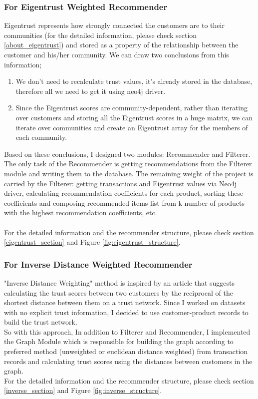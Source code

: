 \subsubsection{For Eigentrust Weighted Recommender}
Eigentrust represents how strongly connected the customers are to their communities (for the detailed information, please check section \ref{about_eigentrust}) and stored as a property of the relationship between the customer and his/her community. We can draw two conclusions from this information;
\begin{enumerate}
	\item We don't need to recalculate trust values, it's already stored in the database, therefore all we need to get it using neo4j driver.
	\item Since the Eigentrust scores are community-dependent, rather than iterating over customers and storing all the Eigentrust scores in a huge matrix, we can iterate over communities and create an Eigentrust array for the members of each community.
\end{enumerate}
Based on these conclusions, I designed two modules: Recommender and Filterer. The only task of the Recommender is getting recommendations from the Filterer module and writing them to the database.  The remaining weight of the project is carried by the Filterer: getting transactions and Eigentrust values via Neo4j driver, calculating recommendation coefficients for each product, sorting these coefficients and composing recommended items list from k number of products with the highest recommendation coefficients, etc. \\ \\
For the detailed information and the recommender structure, please check section \ref{eigentrust_section} and Figure \ref{fig:eigentrust_structure}.
\subsubsection{For Inverse Distance Weighted Recommender}
"Inverse Distance Weighting" method is inspired by an article\cite{inverse_article} that suggests calculating the trust scores between two customers by the reciprocal of the shortest distance between them on a trust network. Since I worked on datasets with no explicit trust information, I decided to use customer-product records to build the trust network. \\

So with this approach, In addition to Filterer and Recommender, I implemented the Graph Module which is responsible for building the graph according to preferred method (unweighted or euclidean distance weighted) from transaction records and calculating trust scores using the distances between customers in the graph. \\

For the detailed information and the recommender structure, please check section \ref{inverse_section} and Figure \ref{fig:inverse_structure}.